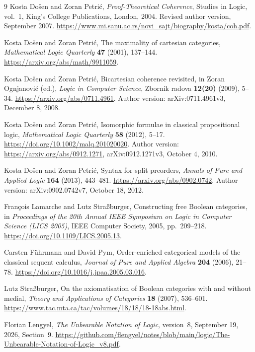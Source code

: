 \documentclass[11pt]{article}
\begin{document}
\clearpage
\begin{thebibliography}{9}
\small
\setlength{\itemsep}{2pt}
\setlength{\parskip}{0pt}
Kosta Do\v{s}en and Zoran Petri\'c,
\emph{Proof-Theoretical Coherence},
Studies in Logic, vol.~1, King's College Publications, London, 2004.
Revised author version, September 2007.
\url{https://www.mi.sanu.ac.rs/novi_sajt/biography/kosta/coh.pdf}.

Kosta Do\v{s}en and Zoran Petri\'c,
The maximality of cartesian categories,
\emph{Mathematical Logic Quarterly} \textbf{47} (2001), 137--144.
\url{https://arxiv.org/abs/math/9911059}.

Kosta Do\v{s}en and Zoran Petri\'c,
Bicartesian coherence revisited,
in Zoran Ognjanovi\'c (ed.), \emph{Logic in Computer Science},
Zbornik radova \textbf{12(20)} (2009), 5--34.
\url{https://arxiv.org/abs/0711.4961}.
Author version: arXiv:0711.4961v3, December 8, 2008.

Kosta Do\v{s}en and Zoran Petri\'c,
Isomorphic formulae in classical propositional logic,
\emph{Mathematical Logic Quarterly} \textbf{58} (2012), 5--17.
\url{https://doi.org/10.1002/malq.201020020}.
Author version: \url{https://arxiv.org/abs/0912.1271},
arXiv:0912.1271v3, October 4, 2010.

Kosta Do\v{s}en and Zoran Petri\'c,
Syntax for split preorders,
\emph{Annals of Pure and Applied Logic} \textbf{164} (2013), 443--481.
\url{https://arxiv.org/abs/0902.0742}.
Author version: arXiv:0902.0742v7, October 18, 2012.

Fran\c{c}ois Lamarche and Lutz Stra{\ss}burger,
Constructing free Boolean categories,
in \emph{Proceedings of the 20th Annual IEEE Symposium on Logic in
Computer Science (LICS 2005)}, IEEE Computer Society, 2005, pp.~209--218.
\url{https://doi.org/10.1109/LICS.2005.13}.

Carsten F\"uhrmann and David Pym,
Order-enriched categorical models of the classical sequent calculus,
\emph{Journal of Pure and Applied Algebra} \textbf{204} (2006), 21--78.
\url{https://doi.org/10.1016/j.jpaa.2005.03.016}.

Lutz Stra{\ss}burger,
On the axiomatisation of Boolean categories with and without medial,
\emph{Theory and Applications of Categories} \textbf{18} (2007),
536--601.
\url{https://www.tac.mta.ca/tac/volumes/18/18/18-18abs.html}.

Florian Lengyel,
\emph{The Unbearable Notation of Logic},
version~8, September 19, 2026, Section~9.
\url{https://github.com/flengyel/notes/blob/main/logic/The-Unbearable-Notation-of-Logic_v8.pdf}.
\end{thebibliography}
\end{document}
